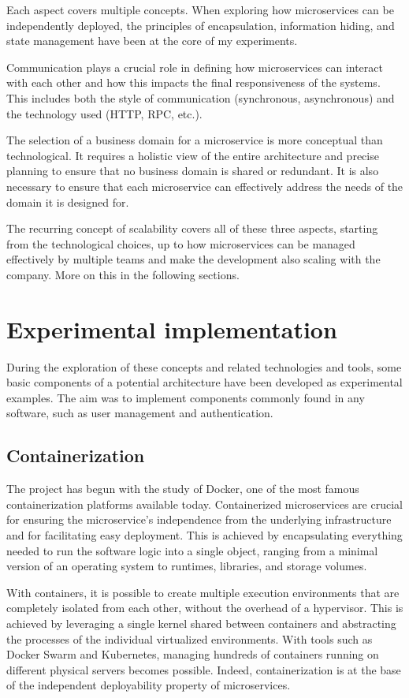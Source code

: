 \documentclass[manuscript,screen,review]{acmart}
\begin{document}
Each aspect covers multiple concepts. When exploring how microservices can be independently deployed, the principles of encapsulation, information hiding, and state management have been at the core of my experiments.

Communication plays a crucial role in defining how microservices can interact with each other and how this impacts the final responsiveness of the systems. This includes both the style of communication (synchronous, asynchronous) and the technology used (HTTP, RPC, etc.).

The selection of a business domain for a microservice is more conceptual than technological. It requires a holistic view of the entire architecture and precise planning to ensure that no business domain is shared or redundant. It is also necessary to ensure that each microservice can effectively address the needs of the domain it is designed for.

The recurring concept of scalability covers all of these three aspects, starting from the technological choices, up to how microservices can be managed effectively by multiple teams and make the development also scaling with the company. More on this in the following sections.

\section{Experimental implementation}
During the exploration of these concepts and related technologies and tools, some basic components of a potential architecture have been developed as experimental examples. The aim was to implement components commonly found in any software, such as user management and authentication.


\subsection{Containerization}
The project has begun with the study of Docker, one of the most famous containerization platforms available today. Containerized microservices are crucial for ensuring the microservice's independence from the underlying infrastructure and for facilitating easy deployment. This is achieved by encapsulating everything needed to run the software logic into a single object, ranging from a minimal version of an operating system to runtimes, libraries, and storage volumes.

With containers, it is possible to create multiple execution environments that are completely isolated from each other, without the overhead of a hypervisor. This is achieved by leveraging a single kernel shared between containers and abstracting the processes of the individual virtualized environments. With tools such as Docker Swarm and Kubernetes, managing hundreds of containers running on different physical servers becomes possible. Indeed, containerization is at the base of the independent deployability property of microservices.
\end{document}
